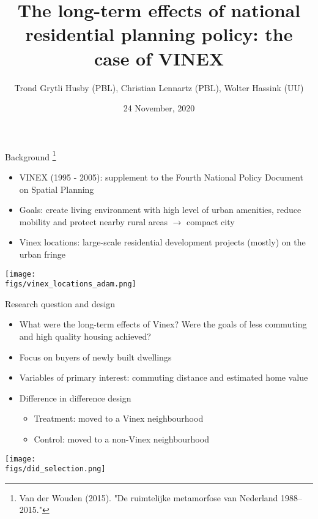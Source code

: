 \documentclass[final, 12pt, aspectratio=169, xcolor={dvipsnames}]{beamer}
\title[PEARL]{The long-term effects of national residential planning policy: the case of VINEX}
\subtitle[PEARL]{}
\author[T. Husby]{Trond Grytli Husby (PBL), Christian Lennartz (PBL), Wolter Hassink (UU)}
\institute[PBL]{
  ODISSEI Community Conference \\[5ex]
  \texttt{trond.husby@pbl.nl}
}
\date[\today]{24 November, 2020}
\newcommand*{\figs}{../figs}%
\begin{document}
\beamertemplatenavigationsymbolsempty

{

  \begin{frame}
    \titlepage
  \end{frame}
}


\begin{frame}{Background \footnote{Van der Wouden (2015). "De ruimtelijke metamorfose \newline van Nederland 1988–2015." }}
  \begin{minipage}{0.48\linewidth}%
    \small
    \begin{itemize}
    \item VINEX (1995 - 2005): supplement to the Fourth National Policy Document on Spatial Planning
    \item Goals: create living environment with high level of urban amenities, reduce mobility and protect nearby rural areas $\rightarrow$ compact city
    \item Vinex locations: large-scale residential development projects (mostly) on the urban fringe
      \end{itemize}
    \end{minipage}
  \begin{minipage}{0.48\linewidth}%
    \texttt{[image: \\figs/vinex\_locations\_adam.png]}
    \end{minipage}
  \end{frame}

\begin{frame}{Research question and design}
  \begin{minipage}{0.58\linewidth}%
    \begin{itemize}
    \item What were the long-term effects of Vinex? Were the goals of less commuting and high quality housing achieved?
     \item Focus on buyers of newly built dwellings
      \item Variables of primary interest: commuting distance and estimated home value
      \item Difference in difference design
        \begin{itemize}
        \item Treatment: moved to a Vinex neighbourhood
          \item Control: moved to a non-Vinex neighbourhood
          \end{itemize}
      \end{itemize}
  \end{minipage}
  \hfill%
  \begin{minipage}{0.38\linewidth}%
    \texttt{[image: \\figs/did\_selection.png]}
    \end{minipage}
\end{frame}
\end{document}
